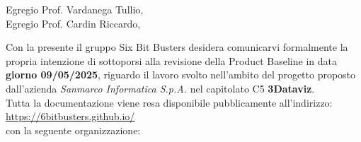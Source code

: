        \noindent Egregio Prof. Vardanega Tullio, \\
        Egregio Prof. Cardin Riccardo,
        \newline
        
        \noindent Con la presente il gruppo Six Bit Busters desidera comunicarvi formalmente la propria
        intenzione di sottoporsi alla revisione della Product Baseline in data \textbf{giorno 09/05/2025}, riguardo il lavoro svolto nell'ambito del progetto proposto dall'azienda \textit{Sanmarco Informatica S.p.A.}
        nel capitolato C5 \textbf{3Dataviz}.\\

        \noindent Tutta la documentazione viene resa disponibile pubblicamente all'indirizzo:\\ \url{https://6bitbusters.github.io/} \\con la
        seguente organizzazione:

